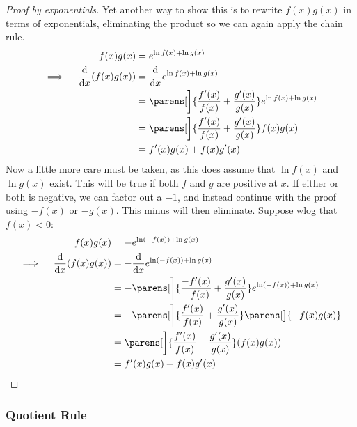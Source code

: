\begin{proof}[Proof by exponentials]
 Yet another way to show this is to rewrite \(f(x)g(x)\) in terms of
 exponentials, eliminating the product so we can again apply the chain rule.
 \begin{alignat*}{2}
  && f(x)g(x) &= e^{\ln f(x) + \ln g(x)} \\
  \implies{}&& \dv{x} (f(x)g(x))
              &= \dv{x} e^{\ln f(x) + \ln g(x)} \\
  &&          &= \parens[\bigg]{\frac{f'(x)}{f(x)} + \frac{g'(x)}{g(x)}}
                   e^{\ln f(x) + \ln g(x)} \\
  &&          &= \parens[\bigg]{\frac{f'(x)}{f(x)} + \frac{g'(x)}{g(x)}}
                   f(x)g(x) \\
  &&          &= f'(x)g(x) + f(x)g'(x)
 \end{alignat*}
 Now a little more care must be taken, as this does assume that \(\ln f(x)\)
 and \(\ln g(x)\) exist. This will be true if both \(f\) and \(g\) are
 positive at \(x\). If either or both is negative, we can factor out a
 \(-1\), and instead continue with the proof using \(-f(x)\) or \(-g(x)\).
 This minus will then eliminate. Suppose wlog that \(f(x) < 0\):
 \begin{alignat*}{2}
  && f(x)g(x) &= -e^{\ln(-f(x)) + \ln g(x)} \\
  \implies{}&& \dv{x} (f(x)g(x))
              &= -\dv{x} e^{\ln(-f(x)) + \ln g(x)} \\
  &&          &= -\parens[\bigg]{\frac{-f'(x)}{-f(x)}
                               + \frac{g'(x)}{g(x)}}
                   e^{\ln(-f(x)) + \ln g(x)} \\
  &&          &= -\parens[\bigg]{\frac{f'(x)}{f(x)} + \frac{g'(x)}{g(x)}}
                   \parens[\big]{-f(x)g(x)} \\
  &&          &= \parens[\bigg]{\frac{f'(x)}{f(x)} + \frac{g'(x)}{g(x)}}
                   (f(x)g(x)) \\
  &&          &= f'(x)g(x) + f(x)g'(x) \qedhere
 \end{alignat*}
\end{proof}

\subsubsection{Quotient Rule} \label{sec_calc_quotient}

